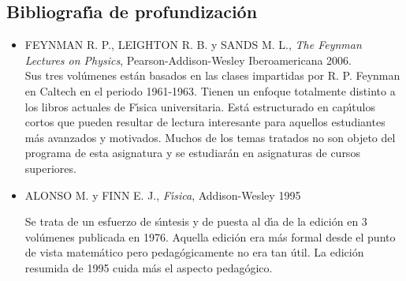 \subsection{Bibliograf\'{\i}a de profundizaci\'{o}n}
\begin{itemize}

\item FEYNMAN  R. P., LEIGHTON R. B. y SANDS M. L.,
 {\it The Feynman Lectures on Physics},
 Pearson-Addison-Wesley Iberoamericana 2006. \\
Sus tres vol\'{u}menes est\'{a}n basados en las clases impartidas por
 R. P. Feynman en Caltech en el periodo 1961-1963.
Tienen un enfoque totalmente distinto a los libros actuales de F\'{\i}sica 
universitaria. Est\'{a} estructurado en cap\'{\i}tulos cortos que pueden resultar 
de lectura interesante para aquellos estudiantes m\'{a}s avanzados y motivados.
Muchos de los temas tratados no son objeto del programa de esta asignatura 
y se estudiar\'{a}n en asignaturas de cursos superiores.



\item ALONSO M. y FINN E. J.,
 {\it F\'{\i}sica},
 Addison-Wesley 1995

Se trata de un esfuerzo de s\'{\i}ntesis y de puesta al d\'{\i}a de la edici\'{o}n en 
3 vol\'{u}menes publicada en 1976. Aquella edici\'{o}n era m\'{a}s formal desde el punto de
 vista matem\'{a}tico pero pedag\'{o}gicamente no era tan \'{u}til.
La edici\'{o}n resumida de 1995 cuida m\'{a}s el aspecto pedag\'{o}gico.

\end{itemize}

